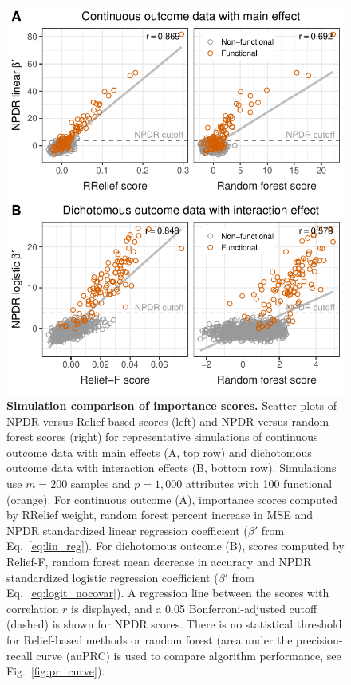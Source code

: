 \documentclass{bioinfo}
\begin{document}
\begin{figure}[!tbp]
\centerline{\includegraphics[trim = 0 0 0 0, scale = 0.58]{../../figs/fig1.pdf}}
\caption{{\bf Simulation comparison of importance scores.} Scatter plots of NPDR versus Relief-based scores (left) and NPDR versus random forest scores (right) for representative simulations of continuous outcome data with main effects (A, top row) and dichotomous outcome data with interaction effects (B, bottom row). Simulations use $m = 200$ samples and $p = 1,000$ attributes with 100 functional (orange). For continuous outcome (A), importance scores computed by RRelief weight, random forest percent increase in MSE and NPDR standardized linear regression coefficient ($\beta'$ from Eq.~\ref{eq:lin_reg}). For dichotomous outcome (B), scores computed by Relief-F, random forest mean decrease in accuracy and NPDR standardized logistic regression coefficient ($\beta'$ from Eq.~\ref{eq:logit_nocovar}). A regression line between the scores with correlation $r$ is displayed, and a 0.05 Bonferroni-adjusted cutoff (dashed) is shown for NPDR scores. There is no statistical threshold for Relief-based methods or random forest (area under the precision-recall curve (auPRC) is used to compare algorithm performance, see Fig.~\ref{fig:pr_curve}).}
\label{fig:npdr_relief}
\end{figure}
\end{document}
